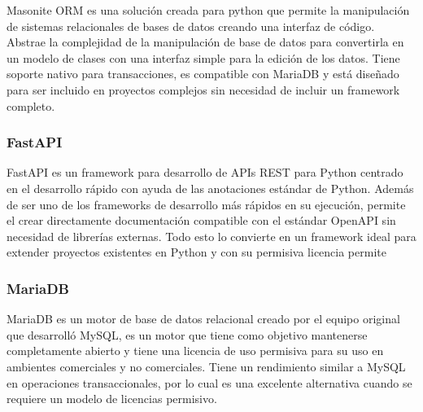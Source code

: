 Masonite ORM es una solución creada para python que permite la manipulación de sistemas relacionales de bases de datos creando una interfaz de código. Abstrae la complejidad de la manipulación de base de datos para convertirla en un modelo de clases con una interfaz simple para la edición de los datos. Tiene soporte nativo para transacciones, es compatible con MariaDB y está diseñado para ser incluido en proyectos complejos sin necesidad de incluir un framework completo\cite{masonite_2021}.

\subsubsection{FastAPI}

FastAPI es un framework para desarrollo de APIs REST para Python centrado en el desarrollo rápido con ayuda de las anotaciones estándar de Python. Además de ser uno de los frameworks de desarrollo más rápidos en su ejecución, permite el crear directamente documentación compatible con el estándar OpenAPI sin necesidad de librerías externas\cite{fastapi_ramirez_2020}. Todo esto lo convierte en un framework ideal para extender proyectos existentes en Python y con su permisiva licencia permite %

\subsubsection{MariaDB}

MariaDB es un motor de base de datos relacional creado por el equipo original que desarrolló MySQL, es un motor que tiene como objetivo mantenerse completamente abierto y tiene una licencia de uso permisiva para su uso en ambientes comerciales y no comerciales\cite{mariadb_foundation_2019}. Tiene un rendimiento similar a MySQL en operaciones transaccionales, por lo cual es una excelente alternativa cuando se requiere un modelo de licencias permisivo\cite{mariadb_comparison}.


